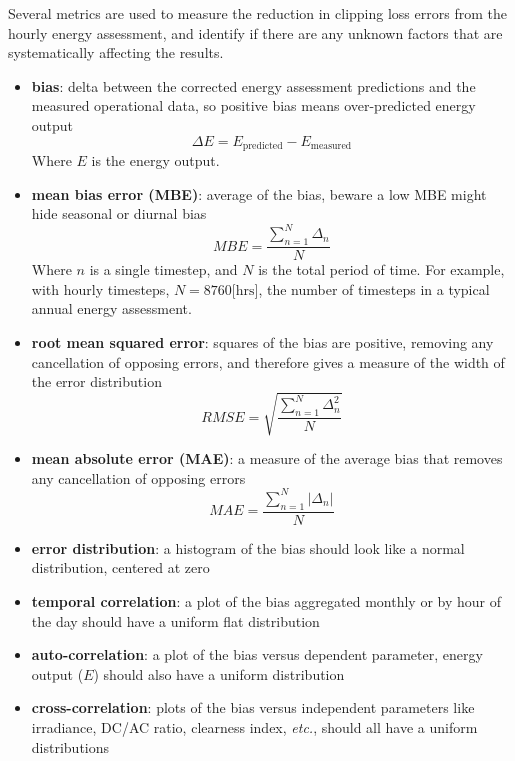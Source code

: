 \documentclass[conference]{IEEEtran}
\begin{document}
Several metrics are used to measure the reduction in clipping loss errors from the hourly energy assessment, and identify if there are any unknown factors that are systematically affecting the results.

\begin{itemize}
\item \textbf{bias}: delta between the corrected energy assessment predictions and the measured operational data, so positive bias means over-predicted energy output 
\begin{equation}
\Delta E={E_\text{predicted}} - {E_\text{measured}}\label{eq:bias}
\end{equation}
Where $E$ is the energy output.
\item \textbf{mean bias error (MBE)}: average of the bias, beware a low MBE might hide seasonal or diurnal bias
\begin{equation}
\mathit{MBE}=\frac{\sum_{n=1}^N{\Delta_n}}{N}\label{eq:mbe}
\end{equation}
Where $n$ is a single timestep, and $N$ is the total period of time. For example, with hourly timesteps, $N=8760\text{[hrs]}$, the number of timesteps in a typical annual energy assessment.
\item \textbf{root mean squared error}: squares of the bias are positive, removing any cancellation of opposing errors, and therefore gives a measure of the width of the error distribution
\begin{equation}
\mathit{RMSE}=\sqrt{\frac{\sum_{n=1}^N{\Delta_n^2}}{N}}\label{eq:rmse}
\end{equation}
\item \textbf{mean absolute error (MAE)}: a measure of the average bias that removes any cancellation of opposing errors
\begin{equation}
\mathit{MAE}=\frac{\sum_{n=1}^N{\left|\Delta_n\right|}}{N}\label{eq:mae}
\end{equation}
\item \textbf{error distribution}: a histogram of the bias should look like a normal distribution, centered at zero
\item \textbf{temporal correlation}: a plot of the bias aggregated monthly or by hour of the day should have a uniform flat distribution
\item \textbf{auto-correlation}: a plot of the bias versus dependent parameter, energy output ($E$) should also have a uniform distribution
\item \textbf{cross-correlation}: plots of the bias versus independent parameters like irradiance, DC/AC ratio, clearness index, \textit{etc.}, should all have a uniform distributions
\end{itemize}
\end{document}

